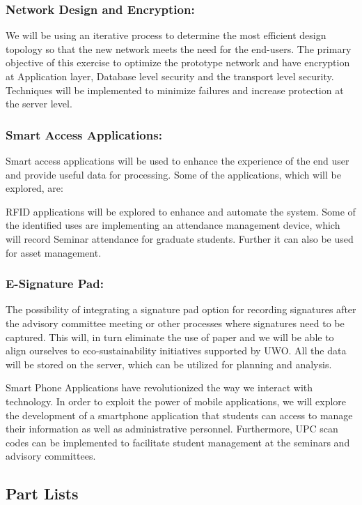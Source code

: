 \documentclass{journal}
\begin{document}
\subsubsection{Network Design and Encryption:}

We will be using an iterative process to determine the most efficient design topology so that the new network meets the need for the end-users. The primary objective of this exercise to optimize the prototype network and have encryption at Application layer, Database level security and the transport level security. Techniques will be implemented to minimize failures and increase protection at the server level. 

\subsubsection{Smart Access Applications:} Smart access applications will be used to enhance the experience of the end user and provide useful data for processing. Some of the applications, which will be explored, are:

RFID applications will be explored to enhance and automate the system. Some of the identified uses are implementing an attendance management device, which will record Seminar attendance for graduate students. Further it can also be used for asset management.

\subsubsection{E-Signature Pad:} The possibility of integrating a signature pad option for recording signatures after the advisory committee meeting or other processes where signatures need to be captured. This will, in turn eliminate the use of paper and we will be able to align ourselves to eco-sustainability initiatives supported by UWO. All the data will be stored on the server, which can be utilized for planning and analysis.

Smart Phone Applications have revolutionized the way we interact with technology. In order to exploit the power of mobile applications, we will explore the development of a smartphone application that students can access to manage their information as well as administrative personnel. Furthermore, UPC scan codes can be implemented to facilitate student management at the seminars and advisory committees.

\subsection{Part Lists} 
\end{document}
